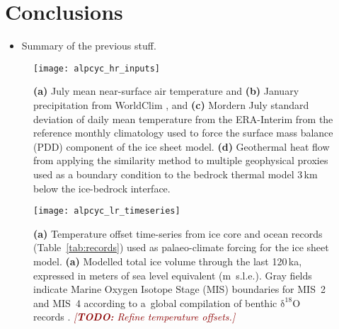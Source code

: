 \documentclass{article}
\newcommand{\todo}[1]{\textcolor{darkred}{\emph{[\textbf{TODO:} #1]}}}
\newcommand{\chem}[1]{\ensuremath{\mathrm{#1}}}
\begin{document}
\section{Conclusions}

    \begin{itemize}
    \item Summary of the previous stuff.
    \end{itemize}







\clearpage

    \begin{figure}
      \centerline{\texttt{[image: alpcyc\_hr\_inputs]}}
      \caption{%
        \textbf{(a)} July mean near-surface air temperature and
        \textbf{(b)} January precipitation from WorldClim
        \citep[1960--1990]{Hijmans.etal.2005}, and
        \textbf{(c)} Mordern July standard deviation of daily mean temperature
        from the ERA-Interim \citep[1979--2012]{Dee.etal.2011} from the
        reference monthly climatology used to force the surface mass balance
        (PDD) component of the ice sheet model.
        \textbf{(d)} Geothermal heat flow from applying the similarity method
        to multiple geophysical proxies \citep{Goutorbe.etal.2011} used as a
        boundary condition to the bedrock thermal model 3\,km below the
        ice-bedrock interface.}
      \label{fig:inputs}
    \end{figure}

    \begin{figure}
      \centerline{\texttt{[image: alpcyc\_lr\_timeseries]}}
      \caption{%
        \textbf{(a)} Temperature offset time-series from ice core and ocean
        records (Table~\ref{tab:records}) used as palaeo-climate forcing for
        the ice sheet model.
        \textbf{(a)} Modelled total ice volume through the last 120\,ka,
        expressed in meters of sea level equivalent (m~s.l.e.). Gray fields
        indicate Marine Oxygen Isotope Stage (MIS) boundaries for MIS~2 and
        MIS~4 according to a~global compilation of benthic \chem{\delta^{18}O}
        records \citep{Lisiecki.Raymo.2005}.
        \todo{Refine temperature offsets.}}
      \label{fig:timeseries}
    \end{figure}
\end{document}
